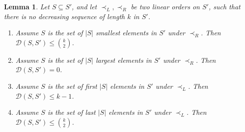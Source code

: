 \documentclass[11pt]{amsart}
\newtheorem{lemma}[theorem]{Lemma}
\theoremstyle{definition}
\newcommand{\cD}{\mathcal{D}}
\begin{document}
\begin{lemma}\label{lemma:erdos-szekeres}
Let $S\subseteq S'$, and let $\prec_L, \prec_R$ be two linear orders on $S'$, such that there is no decreasing sequence of length $k$ in $S'$.
\begin{enumerate}
  \item Assume $S$ is the set of $|S|$ smallest elements in $S'$ under $\prec_R$. Then $\cD(S, S') \leq \binom{k}{2}$.

  \item Assume $S$ is the set of $|S|$ largest elements in $S'$ under $\prec_R$. Then $\cD(S, S') =0$.
  
  \item Assume $S$ is the set of first $|S|$ elements in $S'$ under $\prec_L$. Then $\cD(S, S')\leq k-1$.

  \item Assume $S$ is the set of last $|S|$ elements in $S'$ under $\prec_L$. Then $\cD(S, S') \leq \binom{k}{2}$.
\end{enumerate}
\end{lemma}
\vspace{-0.4cm}
\end{document}
